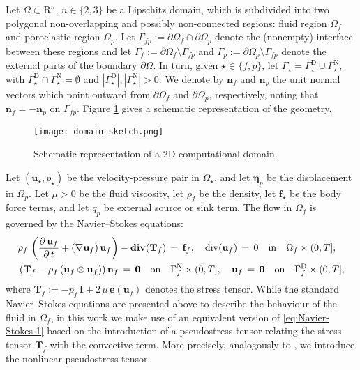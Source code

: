 \documentclass[11pt]{article}
\numberwithin{equation}{section}
\newcommand{\bbeta}{{\boldsymbol\eta}}
\newcommand{\f}{\mathbf{f}}
\newcommand{\bu}{\mathbf{u}}
\newcommand{\bn}{{\mathbf{n}}}
\newcommand{\be}{{\mathbf{e}}}
\newcommand{\0}{{\mathbf{0}}}
\def\bI{\mathbf{I}}
\def\bT{\mathbf{T}}
\def\R{\mathrm{R}}
\def\rD{\mathrm{D}}
\def\rN{\mathrm{N}}
\def\bdiv{\mathbf{div}}
\def\div{\mathrm{div}}
\def\qin{{\quad\hbox{in}\quad}}
\def\qon{{\quad\hbox{on}\quad}}
\numberwithin{equation}{section}
\begin{document}
Let $\Omega\subset \R^n$, $n\in\{2,3\}$ be a Lipschitz domain, which is subdivided into two polygonal non-overlapping and possibly non-connected regions: fluid region $\Omega_f$ and poroelastic region $\Omega_p$.
Let $\Gamma_{fp} := \partial\Omega_f\cap\partial\Omega_p$ denote the (nonempty) interface between these regions and let $\Gamma_f := \partial\Omega_f\setminus\Gamma_{fp}$ and $\Gamma_p := \partial\Omega_p\setminus\Gamma_{fp}$ denote the external parts of the boundary $\partial\Omega$.
In turn, given $\star\in\{f,p\}$, let $\Gamma_\star = \Gamma^\rD_\star\cup \Gamma^\rN_\star$, with $\Gamma^\rD_\star\cap \Gamma^\rN_\star = \emptyset$ and $|\Gamma^\rD_\star|, |\Gamma^\rN_\star| > 0$. We denote by $\bn_f$ and $\bn_p$ the unit normal vectors which point outward from $\partial\Omega_f$ and $\partial\Omega_p$, respectively, noting that $\bn_f = - \bn_p$ on $\Gamma_{fp}$. Figure \ref{fig:domain_sketch} gives a schematic representation of the geometry. 
%
\begin{figure}[t]
\centering\texttt{[image: domain-sketch.png]}
	
\vspace{-0.2cm}
\caption{Schematic representation of a 2D computational domain.}
\label{fig:domain_sketch}
\end{figure}
%
Let $(\bu_\star,p_\star)$ be the veloci\-ty-pressure pair in $\Omega_\star$, and let $\bbeta_p$ be the displacement in $\Omega_p$.
Let $\mu>0$ be the fluid viscosity, let $\rho_f$ be the density, let $\f_\star$ be 
the body force terms, and let $q_p$ be external source or sink term. The flow in $\Omega_f$ is governed by the Navier--Stokes equations:
%
\begin{align}
& \rho_f\,\left(\frac{\partial\,\bu_f}{\partial\,t} + (\nabla\bu_f)\,\bu_f\right) - \bdiv(\bT_f) \,=\, \f_f,\quad \div(\bu_f) \,=\, 0 \qin \Omega_f\times (0,T], \nonumber\\ 
&\left(\bT_f - \rho_f\,(\bu_f\otimes\bu_f) \right)\bn_f \,=\, \0 \qon \Gamma^\rN_f\times (0,T],\quad 
\bu_f \,=\, \0 \qon \Gamma^\rD_f\times (0,T],\label{eq:Navier-Stokes-1}
\end{align}
where $\bT_f := -p_f\,\bI + 2\,\mu\,\be(\bu_f)$ denotes the stress tensor.
While the standard Navier--Stokes equations are presented above to describe the behaviour of the fluid in $\Omega_f$, in this work we make use of an equivalent version of \eqref{eq:Navier-Stokes-1} based on the introduction of a pseudostress tensor relating the stress tensor $\bT_f$ with the convective term.
More precisely, analogously to \cite{cgo2021}, we introduce the nonlinear-pseudostress tensor
\end{document}
